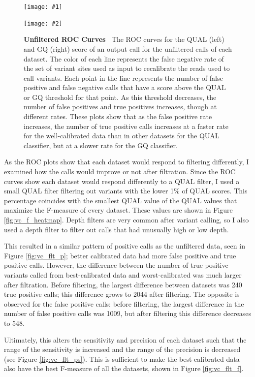 \documentclass{report}
\newcommand{\titlecaption}[2]{\caption[#1]{\textbf{#1 \textbar\,} #2}}
\newcommand{\includetwo}[2]{\begin{minipage}{.475\textwidth}%
\texttt{[image: \#1]}%
\end{minipage}\hfill\begin{minipage}{.475\textwidth}%
\texttt{[image: \#2]}%
\end{minipage}}
\begin{document}
\begin{figure}
\centering
\includetwo{qualroc.pdf}{gqroc.pdf}
\titlecaption{Unfiltered ROC Curves}{The ROC curves for the QUAL (left) and GQ (right) score of an output call for the unfiltered calls of each dataset. The color of each line represents the false negative rate of the set of variant sites used as input to recalibrate the reads used to call variants. Each point in the line represents the number of false positive and false negative calls that have a score above the QUAL or GQ threshold for that point. As this threshold decreases, the number of false positives and true positives increases, though at different rates. These plots show that as the false positive rate increases, the number of true positive calls increases at a faster rate for the well-calibrated data than in other datasets for the QUAL classifier, but at a slower rate for the GQ classifier.}
\label{fig:vc_rocs}
\end{figure}

\begin{outline}
\item As the ROC plots show that each dataset would respond to filtering differently, I examined how the calls would improve or not after filtration. Since the ROC curves show each dataset would respond differently to a QUAL filter, I used a small QUAL filter filtering out variants with the lower 1\% of QUAL scores. This percentage coincides with the smallest QUAL value of the QUAL values that maximize the F-measure of every dataset. These values are shown in Figure \ref{fig:vc_f_heatmap}. Depth filters are very common after variant calling, so I also used a depth filter to filter out calls that had unusually high or low depth.
\item This resulted in a similar pattern of positive calls as the unfiltered data, seen in Figure \ref{fig:vc_flt_p}; better calibrated data had more false positive and true positive calls. However, the difference between the number of true positive variants called from best-calibrated data and worst-calibrated was much larger after filtration. Before filtering, the largest difference between datasets was 240 true positive calls; this difference grows to 2044 after filtering. The opposite is observed for the false positive calls: before filtering, the largest difference in the number of false positive calls was 1009, but after filtering this difference decreases to 548. 
\item Ultimately, this alters the sensitivity and precision of each dataset such that the range of the sensitivity is increased and the range of the precision is decreased (see Figure \ref{fig:vc_flt_ps}). This is sufficient to make the best-calibrated data also have the best F-measure of all the datasets, shown in Figure \ref{fig:vc_flt_f}.
\end{outline}
\end{document}
